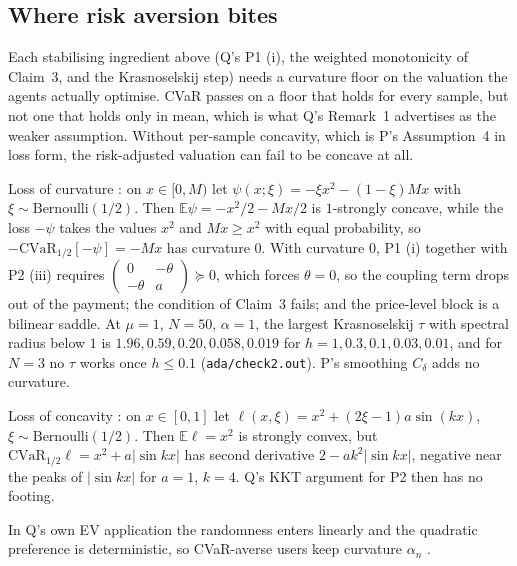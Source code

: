 \documentclass{article}
\begin{document}
\subsection{Where risk aversion bites}

\begin{claim}
Each stabilising ingredient above (Q's P1 (i), the weighted monotonicity of Claim~3, and the Krasnoselskij step) needs a curvature floor on the valuation the agents actually optimise. CVaR passes on a floor that holds for every sample, but not one that holds only in mean, which is what Q's Remark~1 advertises as the weaker assumption. Without per-sample concavity, which is P's Assumption~4 in loss form, the risk-adjusted valuation can fail to be concave at all. 
\end{claim}

Loss of curvature : on \(x\in[0,M)\) let \(\psi(x;\xi)=-\xi x^2-(1-\xi)Mx\) with \(\xi\sim\mathrm{Bernoulli}(1/2)\). Then \(\mathbb E\psi=-x^2/2-Mx/2\) is \(1\)-strongly concave, while the loss \(-\psi\) takes the values \(x^2\) and \(Mx\ge x^2\) with equal probability, so \(-\mathrm{CVaR}_{1/2}[-\psi]=-Mx\) has curvature \(0\). With curvature \(0\), P1 (i) together with P2 (iii) requires \(\begin{pmatrix}0&-\theta\\-\theta&a\end{pmatrix}\succeq0\), which forces \(\theta=0\), so the coupling term drops out of the payment; the condition of Claim~3 fails; and the price-level block is a bilinear saddle. At \(\mu=1\), \(N=50\), \(\alpha=1\), the largest Krasnoselskij \(\tau\) with spectral radius below \(1\) is \(1.96,0.59,0.20,0.058,0.019\) for \(h=1,0.3,0.1,0.03,0.01\), and for \(N=3\) no \(\tau\) works once \(h\le0.1\) (\texttt{ada/check2.out}). P's smoothing \(C_\delta\) adds no curvature.

Loss of concavity : on \(x\in[0,1]\) let \(\ell(x,\xi)=x^2+(2\xi-1)a\sin(kx)\), \(\xi\sim\mathrm{Bernoulli}(1/2)\). Then \(\mathbb E\ell=x^2\) is strongly convex, but \(\mathrm{CVaR}_{1/2}\ell=x^2+a|\sin kx|\) has second derivative \(2-ak^2|\sin kx|\), negative near the peaks of \(|\sin kx|\) for \(a=1\), \(k=4\). Q's KKT argument for P2 then has no footing.

In Q's own EV application the randomness enters linearly and the quadratic preference is deterministic, so CVaR-averse users keep curvature \(\alpha_n\) .
\end{document}
